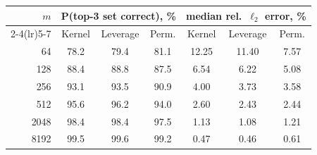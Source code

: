 \begin{tabular}{rcccccc}
\toprule
$m$ & \multicolumn{3}{c}{P(top-3 set correct), \%} & \multicolumn{3}{c}{median rel.\ $\ell_2$ error, \%}\\
\cmidrule(lr){2-4}\cmidrule(lr){5-7}
 & Kernel & Leverage & Perm. & Kernel & Leverage & Perm.\\
\midrule
64 & 78.2 & 79.4 & 81.1 & 12.25 & 11.40 & 7.57\\
128 & 88.4 & 88.8 & 87.5 & 6.54 & 6.22 & 5.08\\
256 & 93.1 & 93.5 & 90.9 & 4.00 & 3.73 & 3.58\\
512 & 95.6 & 96.2 & 94.0 & 2.60 & 2.43 & 2.44\\
2048 & 98.4 & 98.4 & 97.5 & 1.13 & 1.08 & 1.21\\
8192 & 99.5 & 99.6 & 99.2 & 0.47 & 0.46 & 0.61\\
\bottomrule
\end{tabular}
